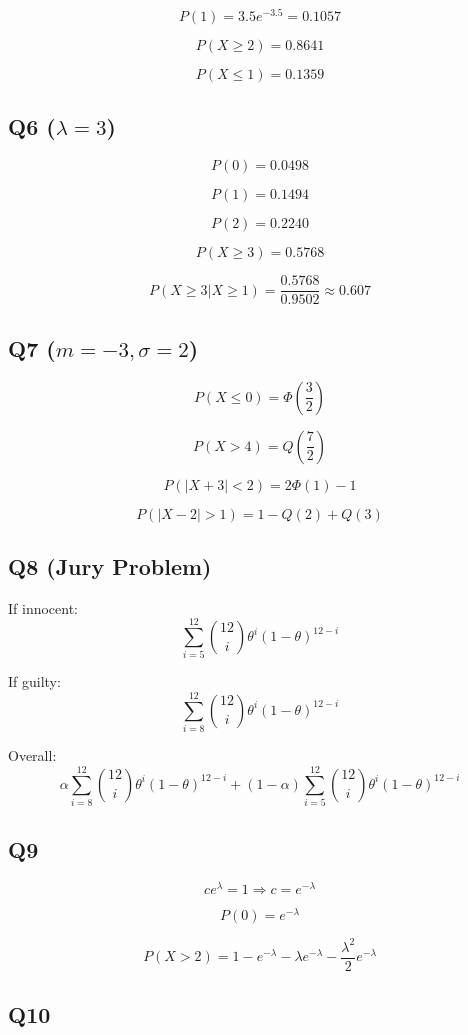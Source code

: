 \documentclass[12pt]{article}
\begin{document}
\[
P(1)=3.5 e^{-3.5}=0.1057
\]

\[
P(X \ge 2)=0.8641
\]

\[
P(X \le 1)=0.1359
\]

\subsection*{Q6 ($\lambda=3$)}

\[
P(0)=0.0498
\]

\[
P(1)=0.1494
\]

\[
P(2)=0.2240
\]

\[
P(X \ge 3)=0.5768
\]

\[
P(X \ge 3 | X \ge 1)=\frac{0.5768}{0.9502}\approx 0.607
\]

\subsection*{Q7 ($m=-3, \sigma=2$)}

\[
P(X \le 0)=\Phi\left(\frac{3}{2}\right)
\]

\[
P(X > 4)=Q\left(\frac{7}{2}\right)
\]

\[
P(|X+3|<2)=2\Phi(1)-1
\]

\[
P(|X-2|>1)=1-Q(2)+Q(3)
\]

\subsection*{Q8 (Jury Problem)}

If innocent:
\[
\sum_{i=5}^{12} \binom{12}{i} \theta^i (1-\theta)^{12-i}
\]

If guilty:
\[
\sum_{i=8}^{12} \binom{12}{i} \theta^i (1-\theta)^{12-i}
\]

Overall:
\[
\alpha \sum_{i=8}^{12} \binom{12}{i} \theta^i (1-\theta)^{12-i}
+
(1-\alpha) \sum_{i=5}^{12} \binom{12}{i} \theta^i (1-\theta)^{12-i}
\]

\subsection*{Q9}

\[
c e^{\lambda}=1 \Rightarrow c=e^{-\lambda}
\]

\[
P(0)=e^{-\lambda}
\]

\[
P(X>2)=1-e^{-\lambda}-\lambda e^{-\lambda}-\frac{\lambda^2}{2}e^{-\lambda}
\]

\subsection*{Q10}
\end{document}
